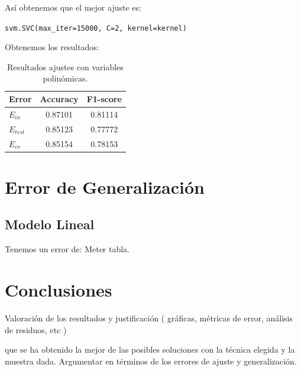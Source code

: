 \documentclass[11pt,a4paper]{article}
\begin{document}
Así obtenemos que el mejor ajuste es:

{\begin{center}
    \texttt{svm.SVC(max\_iter=15000, C=2, kernel=kernel)}
  \end{center}}

Obtenemos los resultados:

\begin{table}[h]
\begin{center}
\begin{tabular}{|l|c|c|}
\hline
  Error & Accuracy & F1-score \\ \hline
  $E_{in}$ & 0.87101 & 0.81114 \\
  $E_{test}$ & 0.85123 & 0.77772  \\
  $E_{cv}$ &0.85154 & 0.78153  \\\hline
\end{tabular}
\caption{Resultados ajustes con variables polinómicas.}

\end{center}
\end{table}



\section{ Error de Generalización}
\subsection{Modelo Lineal}

Tenemos un error de: Meter tabla.


\section{ Conclusiones }
Valoración de los resultados y justificación
( gráficas, métricas de error, análisis de residuos, etc )


que se ha obtenido la mejor de las posibles soluciones con la técnica elegida y la muestra dada. Argumentar en términos de los errores de ajuste y generalización. 
\end{document}
